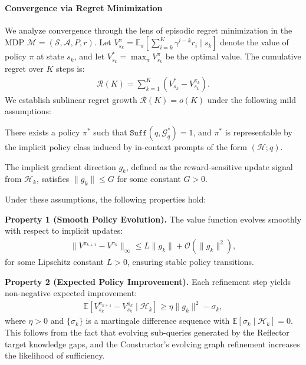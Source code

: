 \paragraph{Convergence via Regret Minimization}
We analyze convergence through the lens of episodic regret minimization in the MDP $\mathcal{M} = (\mathcal{S}, \mathcal{A}, P, r)$. Let $V^{\pi}_{s_k} = \mathbb{E}_{\pi}\left[ \sum_{i=k}^{K} \gamma^{i-k} r_i \mid s_k \right]$ denote the value of policy $\pi$ at state $s_k$, and let $V^*_{s_k} = \max_{\pi} V^{\pi}_{s_k}$ be the optimal value. The cumulative regret over $K$ steps is:
\begin{align}
    \mathcal{R}(K) = \sum_{k=1}^{K} \left( V^*_{s_k} - V^{\pi_k}_{s_k} \right).
\end{align}
We establish sublinear regret growth $\mathcal{R}(K) = o(K)$ under the following mild assumptions:

\begin{assumption}[Realizability]
There exists a policy $\pi^*$ such that $\texttt{Suff}(q, \mathcal{G}^*_q) = 1$, and $\pi^*$ is representable by the implicit policy class induced by in-context prompts of the form $(\mathcal{H}; q)$.
\end{assumption}

\begin{assumption}
The implicit gradient direction $g_k$, defined as the reward-sensitive update signal from $\mathcal{H}_k$, satisfies $\|g_k\| \leq G$ for some constant $G > 0$.
\end{assumption}

Under these assumptions, the following properties hold:

\textbf{Property 1 (Smooth Policy Evolution).}
The value function evolves smoothly with respect to implicit updates:
\begin{align}
    \|V^{\pi_{k+1}} - V^{\pi_k}\|_{\infty} \leq L \|g_k\| + \mathcal{O}(\|g_k\|^2),
\end{align}
for some Lipschitz constant $L > 0$, ensuring stable policy transitions.

\textbf{Property 2 (Expected Policy Improvement).}
Each refinement step yields non-negative expected improvement:
\begin{align}
    \mathbb{E}\left[ V^{\pi_{k+1}}_{s_k} - V^{\pi_k}_{s_k} \mid \mathcal{H}_k \right] \geq \eta \|g_k\|^2 - \sigma_k,
\end{align}
where $\eta > 0$ and $\{\sigma_k\}$ is a martingale difference sequence with $\mathbb{E}[\sigma_k \mid \mathcal{H}_k] = 0$. This follows from the fact that evolving sub-queries generated by the Reflector target knowledge gaps, and the Constructor’s evolving graph refinement increases the likelihood of sufficiency.

